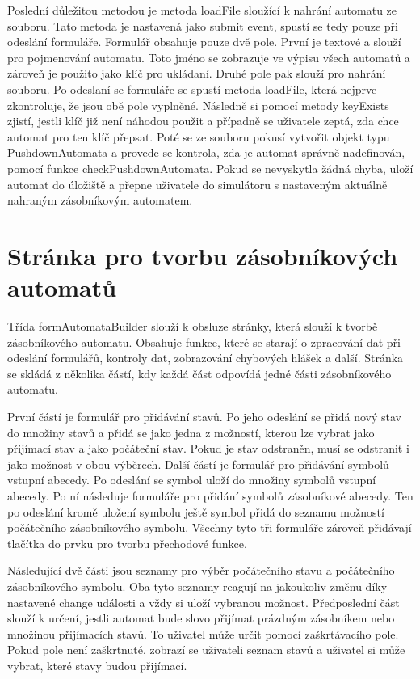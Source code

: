 Poslední důležitou metodou je metoda loadFile sloužící k nahrání automatu ze souboru. Tato metoda je nastavená jako submit event, spustí se tedy pouze při odeslání formuláře. Formulář obsahuje pouze dvě pole. První je textové a slouží pro pojmenování automatu. Toto jméno se zobrazuje ve výpisu všech automatů a zároveň je použito jako klíč pro ukládaní. Druhé pole pak slouží pro nahrání souboru. Po odeslaní se formuláře se spustí metoda loadFile, která nejprve zkontroluje, že jsou obě pole vyplněné. Následně si pomocí metody keyExists zjistí, jestli klíč již není náhodou použit a případně se uživatele zeptá, zda chce automat pro ten klíč přepsat. Poté se ze souboru pokusí vytvořit objekt typu PushdownAutomata a provede se kontrola, zda je automat správně nadefinován, pomocí funkce checkPushdownAutomata. Pokud se nevyskytla žádná chyba, uloží automat do úložiště a přepne uživatele do simulátoru s nastaveným aktuálně nahraným zásobníkovým automatem.

\section{Stránka pro tvorbu zásobníkových automatů}\label{sec:PDABuilderImplementation}

Třída formAutomataBuilder slouží k obsluze stránky, která slouží k tvorbě zásobníkového automatu. Obsahuje funkce, které se starají o zpracování dat při odeslání formulářů, kontroly dat, zobrazování chybových hlášek a další. Stránka se skládá z několika částí, kdy každá část odpovídá jedné části zásobníkového automatu. 

První částí je formulář pro přidávání stavů. Po jeho odeslání se přidá nový stav do množiny stavů a přidá se jako jedna z možností, kterou lze vybrat jako přijímací stav a jako počáteční stav. Pokud je stav odstraněn, musí se odstranit i jako možnost v obou výběrech. Další částí je formulář pro přidávání symbolů vstupní abecedy. Po odeslání se symbol uloží do množiny symbolů vstupní abecedy. Po ní následuje formuláře pro přidání symbolů zásobníkové abecedy. Ten po odeslání kromě uložení symbolu ještě symbol přidá do seznamu možností počátečního zásobníkového symbolu. Všechny tyto tři formuláře zároveň přidávají tlačítka do prvku pro tvorbu přechodové funkce. 

Následující dvě části jsou seznamy pro výběr počátečního stavu a počátečního zásobníkového symbolu. Oba tyto seznamy reagují na jakoukoliv změnu díky nastavené change události a vždy si uloží vybranou možnost. Předposlední část slouží k určení, jestli automat bude slovo přijímat prázdným zásobníkem nebo množinou přijímacích stavů. To uživatel může určit pomocí zaškrtávacího pole. Pokud pole není zaškrtnuté, zobrazí se uživateli seznam stavů a uživatel si může vybrat, které stavy budou přijímací.

